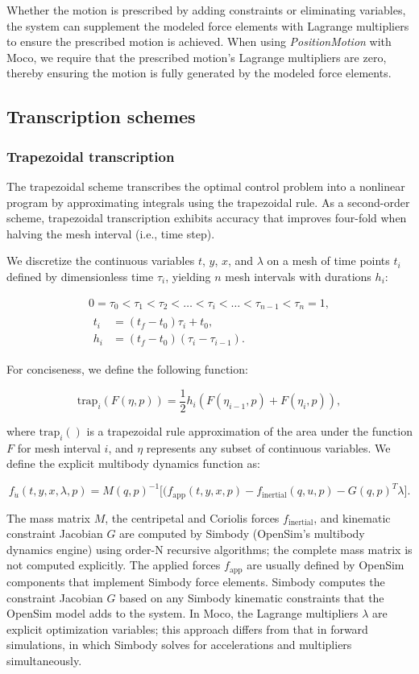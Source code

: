 \documentclass[10pt,letterpaper]{article}
\newcommand{\traptau}{
\begin{equation}
    \begin{gathered}
        0 = \tau_0 < \tau_1 < \tau_2 < \ldots < \tau_i < \ldots < \tau_{n - 1} < \tau_n = 1, \\
        \begin{aligned}
        t_i &= (t_f - t_0) \tau_i + t_0, \\
        h_i &= (t_f - t_0)(\tau_i - \tau_{i-1}).
        \end{aligned}
    \end{gathered}
\end{equation}
}
\newcommand{\trapfunc}{
\begin{equation}
    \textrm{trap}_i(F(\eta, p)) = \frac{1}{2} h_i (F(\eta_{i-1}, p) + F(\eta_i, p)),
\end{equation}
}
\newcommand{\explicitmultibody}{
\begin{equation}
    f_{\dot{u}}(t, y, x, \lambda, p) =
    M(q, p)^{-1}\big[(f_{\textrm{app}}(t, y, x, p) - f_{\textrm{inertial}}(q, u, p) - G(q, p)^T \lambda\big].
\end{equation}
}
\begin{document}
Whether the motion is prescribed by adding constraints or eliminating variables, the system can supplement the modeled force elements with Lagrange multipliers to ensure the prescribed motion is achieved. When using \textit{PositionMotion} with Moco, we require that the prescribed motion’s Lagrange multipliers are zero, thereby ensuring the motion is fully generated by the modeled force elements.

\subsection*{Transcription schemes}

\subsubsection*{Trapezoidal transcription}

The trapezoidal scheme transcribes the optimal control problem into a nonlinear program by approximating integrals using the trapezoidal rule. As a second-order scheme, trapezoidal transcription exhibits accuracy that improves four-fold when halving the mesh interval (i.e., time step).

We discretize the continuous variables $t$, $y$, $x$, and $\lambda$ on a mesh of time points $t_i$ defined by dimensionless time $\tau_i$, yielding $n$ mesh intervals with durations $h_i$:

\traptau

For conciseness, we define the following function:

\trapfunc

where $\mathrm{trap}_i()$ is a trapezoidal rule approximation of the area under the function $F$ for mesh interval $i$, and $\eta$ represents any subset of continuous variables. We define the explicit multibody dynamics function as:

\explicitmultibody

The mass matrix $M$, the centripetal and Coriolis forces $f_\mathrm{inertial}$, and kinematic constraint Jacobian $G$ are computed by Simbody (OpenSim's multibody dynamics engine) using order-N recursive algorithms; the complete mass matrix is not computed explicitly. The applied forces $f_\mathrm{app}$ are usually defined by OpenSim components that implement Simbody force elements. Simbody computes the constraint Jacobian $G$ based on any Simbody kinematic constraints that the OpenSim model adds to the system. In Moco, the Lagrange multipliers $\lambda$ are explicit optimization variables; this approach differs from that in forward simulations, in which Simbody solves for accelerations and multipliers simultaneously.
\end{document}
